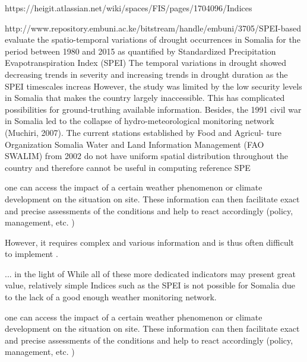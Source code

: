 https://heigit.atlassian.net/wiki/spaces/FIS/pages/1704096/Indices


http://www.repository.embuni.ac.ke/bitstream/handle/embuni/3705/SPEI-based%
evaluate the spatio-temporal variations of drought occurrences in Somalia for the period between 1980 and 2015 as quantified by Standardized Precipitation Evapotranspiration Index (SPEI)
The temporal variations in drought showed decreasing trends in severity and increasing trends in drought duration as the SPEI timescales increas
However, the study was limited by the low security levels in Somalia that makes
the country largely inaccessible. This has complicated possibilities for
ground-truthing available information. Besides, the 1991 civil war in
Somalia led to the collapse of hydro-meteorological monitoring network
(Muchiri, 2007). The current stations established by Food and Agricul-
ture Organization Somalia Water and Land Information Management
(FAO SWALIM) from 2002 do not have uniform spatial distribution
throughout the country and therefore cannot be useful in computing
reference SPE

one can access the impact of a certain weather phenomenon or climate development on the situation on site. These information can then facilitate exact and precise assessments of the conditions and help to react accordingly (policy, management, etc. ) 


However, it requires complex and various information and is thus often difficult to implement \autocite{liuWaterScarcityAssessments2017}.

... in the light of
While all of these more dedicated indicators may present great value, relatively simple Indices such as the SPEI is not possible for Somalia due to the lack of a good enough weather monitoring network. 

one can access the impact of a certain weather phenomenon or climate development on the situation on site. These information can then facilitate exact and precise assessments of the conditions and help to react accordingly (policy, management, etc. ) 


